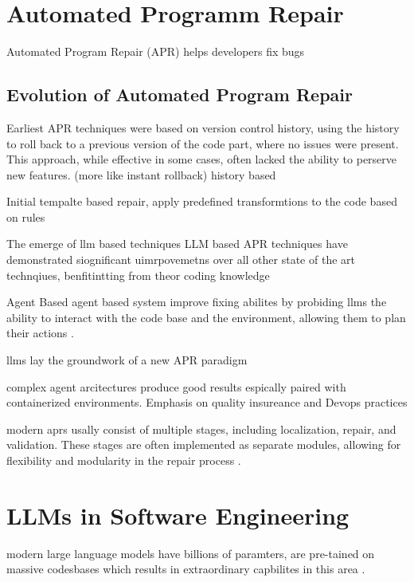 \section{Automated Programm Repair}

Automated Program Repair (APR) helps developers fix bugs


\subsection{Evolution of Automated Program Repair}
Earliest APR techniques were based on version control history, using the history to roll back to a previous version of the code part, where no issues were present. This approach, while effective in some cases, often lacked the ability to perserve new features. (more like instant rollback)
history based

Initial tempalte based repair,
apply predefined transformtions to the code based on rules

The emerge of llm based techniques
LLM based APR techniques have demonstrated siognificant uimrpovemetns over all other state of the art technqiues, benfitintting from theor coding knowledge \cite{hossainDeepDiveLarge2024}

Agent Based
agent based system improve fixing abilites by probiding llms the ability to interact with the code base and the environment, allowing them to plan their actions  \cite{yangSWEagentAgentComputerInterfaces2024}.

llms lay the groundwork of a new APR paradigm \cite{chenUnveilingPitfallsUnderstanding2025}

complex agent arcitectures produce good results espically paired with containerized environments. Emphasis on quality insureance and Devops practices \cite{puvvadiCodingAgentsComprehensive2025}


modern aprs usally consist of multiple stages, including localization, repair, and validation. These stages are often implemented as separate modules, allowing for flexibility and modularity in the repair process \cite{yangSWEagentAgentComputerInterfaces2024}.


\section{LLMs in Software Engineering}

modern large language models have billions of paramters, are pre-tained on massive codesbases which results in extraordinary capbilites in this area  \cite{chenUnveilingPitfallsUnderstanding2025}.

